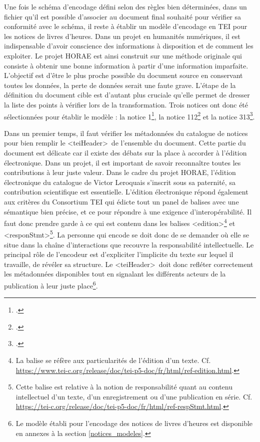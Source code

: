 \documentclass[a4paper,12pt,twoside]{book}
\begin{document}
Une fois le schéma d'encodage défini selon des règles bien déterminées, dans un fichier qu'il est possible d'associer au document final souhaité pour vérifier sa conformité avec le schéma, il reste à établir un modèle d'encodage en TEI pour les notices de livres d'heures. Dans un projet en humanités numériques, il est indispensable d'avoir conscience des informations à disposition et de comment les exploiter. Le projet HORAE est ainsi construit sur une méthode originale qui consiste à obtenir une bonne information à partir d’une information imparfaite. L’objectif est d’être le plus proche possible du document source en conservant toutes les données, la perte de données serait une faute grave. L'étape de la définition du document cible est d'autant plus cruciale qu'elle permet de dresser la liste des points à vérifier lors de la transformation. Trois notices ont donc été sélectionnées pour établir le modèle : la notice 1\footcite[p. 1-7]{Leroquais_notices}, la notice 112\footcite[p. 213-232]{Leroquais_notices} et la notice 313\footcite[p. 303-304]{Leroquais_notices}.  

Dans un premier temps, il faut vérifier les métadonnées du catalogue de notices pour bien remplir le \textless teiHeader\textgreater~de l’ensemble du document. Cette partie du document est délicate car il existe des débats sur la place à accorder à l’édition électronique. Dans un projet, il est important de savoir reconnaître toutes les contributions à leur juste valeur. Dans le cadre du projet HORAE, l’édition électronique du catalogue de Victor Leroquais s’inscrit sous sa paternité, sa contribution scientifique est essentielle. L’édition électronique répond également aux critères du Consortium TEI qui édicte tout un panel de balises avec une sémantique bien précise, et ce pour répondre à une exigence d’interopérabilité. Il faut donc prendre garde à ce qui est contenu dans les balises \textless edition\textgreater \footnote{La balise se réfère aux particularités de l'édition d'un texte. Cf. \url{https://www.tei-c.org/release/doc/tei-p5-doc/fr/html/ref-edition.html}.} et \textless responStmt\textgreater \footnote{Cette balise est relative à la notion de responsabilité quant au contenu intellectuel d'un texte, d'un enregistrement ou d'une publication en série. Cf. \url{https://tei-c.org/release/doc/tei-p5-doc/fr/html/ref-respStmt.html}.}. La personne qui encode se doit donc de se demander où elle se situe dans la chaîne d’interactions que recouvre la responsabilité intellectuelle. Le principal rôle de l’encodeur est d’expliciter l’implicite du texte sur lequel il travaille, de révéler sa structure. Le \textless teiHeader\textgreater~doit donc refléter correctement les métadonnées disponibles tout en signalant les différents acteurs de la publication à leur juste place\footnote{Le modèle établi pour l'encodage des notices de livres d'heures est disponible en annexes à la section \ref{notices_modeles}.}.
\end{document}
